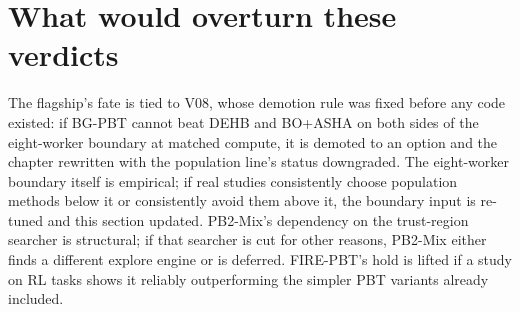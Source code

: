 \section{What would overturn these verdicts}

The flagship's fate is tied to V08, whose demotion rule was fixed
before any code existed: if BG-PBT cannot beat DEHB and BO+ASHA on
both sides of the eight-worker boundary at matched compute, it is
demoted to an option and the chapter rewritten with the population
line's status downgraded. The eight-worker boundary itself is
empirical; if real studies consistently choose population methods
below it or consistently avoid them above it, the boundary input is
re-tuned and this section updated. PB2-Mix's dependency on the
trust-region searcher is structural; if that searcher is cut for
other reasons, PB2-Mix either finds a different explore engine or is
deferred. FIRE-PBT's hold is lifted if a study on RL tasks shows it
reliably outperforming the simpler PBT variants already included.
